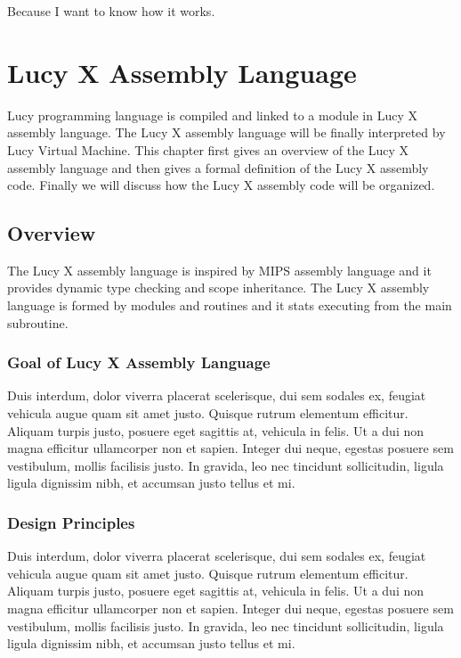 \begin{savequote}[75mm]
Because I want to know how it works.
\end{savequote}

\chapter{Lucy X Assembly Language}
Lucy programming language is compiled and linked to a module in Lucy X assembly language. The Lucy X assembly language will be finally interpreted by Lucy Virtual Machine. This chapter first gives an overview of the Lucy X assembly language and then gives a formal definition of the Lucy X assembly code. Finally we will discuss how the Lucy X assembly code will be organized.

\section{Overview}
The Lucy X assembly language is inspired by MIPS assembly language and it provides dynamic type checking and scope inheritance. The Lucy X assembly language is formed by modules and routines and it stats executing from the main subroutine.

\subsection{Goal of Lucy X Assembly Language}
Duis interdum, dolor viverra placerat scelerisque, dui sem sodales ex, feugiat vehicula augue quam sit amet justo. Quisque rutrum elementum efficitur. Aliquam turpis justo, posuere eget sagittis at, vehicula in felis. Ut a dui non magna efficitur ullamcorper non et sapien. Integer dui neque, egestas posuere sem vestibulum, mollis facilisis justo. In gravida, leo nec tincidunt sollicitudin, ligula ligula dignissim nibh, et accumsan justo tellus et mi.

\subsection{Design Principles}
Duis interdum, dolor viverra placerat scelerisque, dui sem sodales ex, feugiat vehicula augue quam sit amet justo. Quisque rutrum elementum efficitur. Aliquam turpis justo, posuere eget sagittis at, vehicula in felis. Ut a dui non magna efficitur ullamcorper non et sapien. Integer dui neque, egestas posuere sem vestibulum, mollis facilisis justo. In gravida, leo nec tincidunt sollicitudin, ligula ligula dignissim nibh, et accumsan justo tellus et mi.

